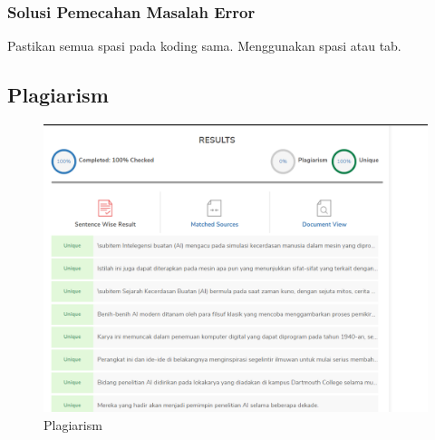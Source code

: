 \subsubsection{Solusi Pemecahan Masalah Error}
Pastikan semua spasi pada koding sama. Menggunakan spasi atau tab.

\subsection{Plagiarism}
    \begin{figure}[H]
        \centering
        \includegraphics[width=1\textwidth]{figures/1174050/chapter1/plagiarism.png}
        \caption{Plagiarism}
        \label{print}
    \end{figure}